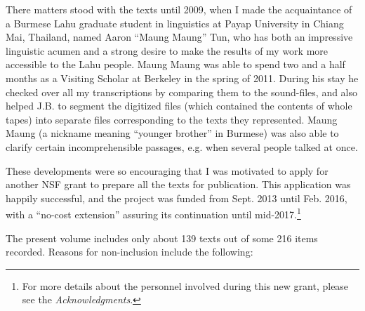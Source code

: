 There matters stood with the texts until 2009, when I made the
acquaintance of a Burmese Lahu graduate student in linguistics at Payap
University in Chiang Mai, Thailand, named Aaron ``Maung Maung'' Tun, who
has both an impressive linguistic acumen and a strong desire to make the
results of my work more accessible to the Lahu people. Maung Maung was
able to spend two and a half months as a Visiting Scholar at Berkeley in
the spring of 2011. During his stay he checked over all my
transcriptions by comparing them to the sound-files, and also helped
J.B. to segment the digitized files (which contained the contents of
whole tapes) into separate files corresponding to the texts they
represented. Maung Maung (a nickname meaning ``younger brother'' in
Burmese) was also able to clarify certain incomprehensible passages,
e.g. when several people talked at once.

These developments were so encouraging that I was motivated to apply for
another NSF grant to prepare all the texts for publication. This
application was happily successful, and the project was funded from
Sept. 2013 until Feb. 2016, with a ``no-cost extension'' assuring its
continuation until mid-2017.\footnote{For more details about the
  personnel involved during this new grant, please see the
  \emph{Acknowledgments}.}

The present volume includes only about 139 texts out of some 216 items
recorded. Reasons for non-inclusion include the following:

